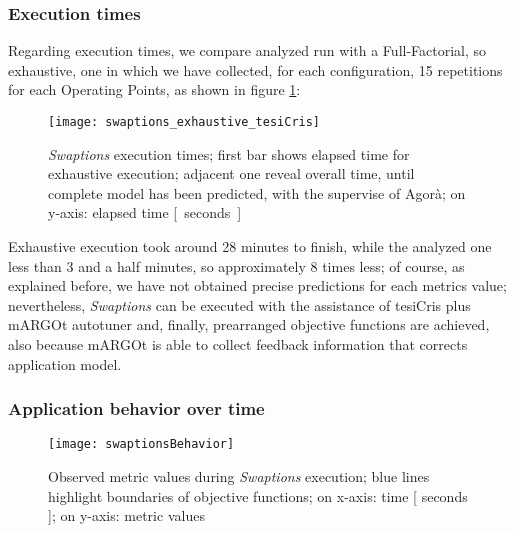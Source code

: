 \subsubsection{Execution times}

Regarding execution times, we compare analyzed run with a Full-Factorial, so exhaustive, one in which we have collected, for each configuration, 15 repetitions for each Operating Points, as shown in figure \ref{fig::sw::execT}:

\begin{figure}[H]

    \centering
    
    \texttt{[image: swaptions\_exhaustive\_tesiCris]}
    
    \caption{\textit{Swaptions} execution times; first bar shows elapsed time for exhaustive execution; adjacent one reveal overall time, until complete model has been predicted, with the supervise of Agorà; on y-axis: elapsed time \hbox{[ seconds ]}}
    
    \label{fig::sw::execT}
    
\end{figure}

Exhaustive execution took around 28 minutes to finish, while the analyzed one less than 3 and a half minutes, so approximately 8 times less; of course, as explained before, we have not obtained precise predictions for each metrics value; nevertheless, \textit{Swaptions} can be executed with the assistance of tesiCris plus mARGOt autotuner and, finally, prearranged objective functions are achieved, also because mARGOt is able to collect feedback information that corrects application model.


\subsubsection{Application behavior over time}

\begin{figure}[H]

    \centering
    
    \texttt{[image: swaptionsBehavior]}
    
    \caption{Observed metric values during \textit{Swaptions} execution; blue lines highlight boundaries of objective functions; on x-axis: time [ seconds ]; on y-axis: metric values}
    
    \label{fig::sw::beh}
    
\end{figure}

